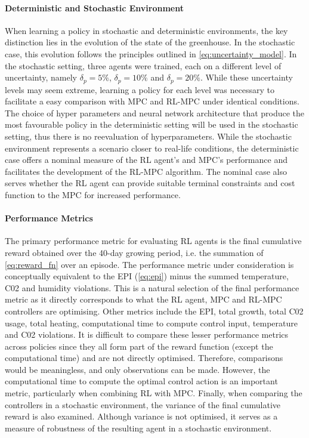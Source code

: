 \paragraph{Deterministic and Stochastic Environment}
When learning a policy in stochastic and deterministic environments, the key distinction lies in the evolution of the state of the greenhouse. In the stochastic case, this evolution follows the principles outlined in \autoref{eq:uncertainty_model}. In the stochastic setting, three agents were trained, each on a different level of uncertainty, namely $\delta_p = 5\%$, $\delta_p = 10\%$ and $\delta_p = 20\%$. While these uncertainty levels may seem extreme, learning a policy for each level was necessary to facilitate a easy comparison with MPC and RL-MPC under identical conditions. The choice of hyper parameters and neural network architecture that produce the most favourable policy in the deterministic setting will be used in the stochastic setting, thus there is no reevaluation of hyperparameters. While the stochastic environment represents a scenario closer to real-life conditions, the deterministic case offers a nominal measure of the RL agent's and MPC's performance and facilitates the development of the RL-MPC algorithm. The nominal case also serves whether the RL agent can provide suitable terminal constraints and cost function to the MPC for increased performance.

\paragraph{Performance Metrics}
The primary performance metric for evaluating RL agents is the final cumulative reward obtained over the 40-day growing period, i.e. the summation of \autoref{eq:reward_fn} over an episode. The performance metric under consideration is conceptually equivalent to the EPI (\autoref{eq:epi}) minus the summed temperature, C02 and humidity violations. This is a natural selection of the final performance metric as it directly corresponds to what the RL agent, MPC and RL-MPC controllers are optimising. Other metrics include the EPI, total growth, total C02 usage, total heating, computational time to compute control input, temperature and C02 violations. It is difficult to compare these lesser performance metrics across policies since they all form part of the reward function (except the computational time) and are not directly optimised. Therefore, comparisons would be meaningless, and only observations can be made. However, the computational time to compute the optimal control action is an important metric, particularly when combining RL with MPC. Finally, when comparing the controllers in a stochastic environment, the variance of the final cumulative reward is also examined. Although variance is not optimised, it serves as a measure of robustness of the resulting agent in a stochastic environment.

